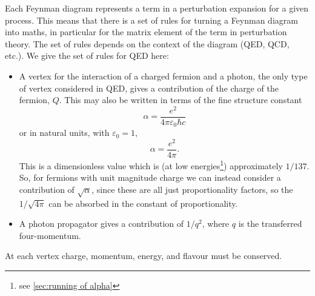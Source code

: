 \documentclass[fleqn]{NotesClass}
\begin{document}
    Each Feynman diagram represents a term in a perturbation expansion for a given process.
    This means that there is a set of rules for turning a Feynman diagram into maths, in particular for the matrix element of the term in perturbation theory.
    The set of rules depends on the context of the diagram (QED, QCD, etc.).
    We give the set of rules for QED here:
    \begin{itemize}
        \item A vertex for the interaction of a charged fermion and a photon, the only type of vertex considered in QED, gives a contribution of the charge of the fermion, \(Q\).
        This may also be written in terms of the fine structure constant
        \begin{equation}
            \alpha = \frac{e^2}{4\pi\varepsilon_0\hbar c}
        \end{equation}
        or in natural units, with \(\varepsilon_0 = 1\),
        \begin{equation}
            \alpha = \frac{e^2}{4\pi}.
        \end{equation}
        This is a dimensionless value which is (at low energies\footnote{see \cref{sec:running of alpha}}) approximately \(1/137\).
        So, for fermions with unit magnitude charge we can instead consider a contribution of \(\sqrt{\alpha}\), since these are all just proportionality factors, so the \(1/\sqrt{4\pi}\) can be absorbed in the constant of proportionality.
        \item A photon propagator gives a contribution of \(1/q^2\), where \(q\) is the transferred four-momentum.
    \end{itemize}
    At each vertex charge, momentum, energy, and flavour must be conserved.
    
\end{document}
